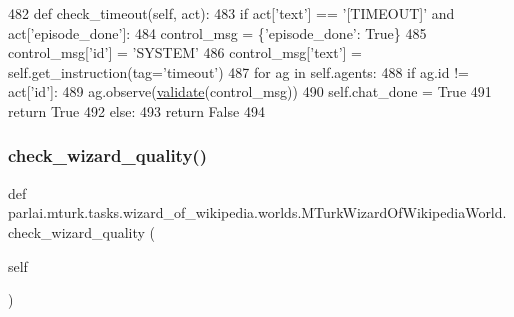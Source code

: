 \begin{DoxyCode}
482     \textcolor{keyword}{def }check\_timeout(self, act):
483         \textcolor{keywordflow}{if} act[\textcolor{stringliteral}{'text'}] == \textcolor{stringliteral}{'[TIMEOUT]'} \textcolor{keywordflow}{and} act[\textcolor{stringliteral}{'episode\_done'}]:
484             control\_msg = \{\textcolor{stringliteral}{'episode\_done'}: \textcolor{keyword}{True}\}
485             control\_msg[\textcolor{stringliteral}{'id'}] = \textcolor{stringliteral}{'SYSTEM'}
486             control\_msg[\textcolor{stringliteral}{'text'}] = self.get\_instruction(tag=\textcolor{stringliteral}{'timeout'})
487             \textcolor{keywordflow}{for} ag \textcolor{keywordflow}{in} self.agents:
488                 \textcolor{keywordflow}{if} ag.id != act[\textcolor{stringliteral}{'id'}]:
489                     ag.observe(\hyperlink{namespaceparlai_1_1core_1_1worlds_afc3fad603b7bce41dbdc9cdc04a9c794}{validate}(control\_msg))
490             self.chat\_done = \textcolor{keyword}{True}
491             \textcolor{keywordflow}{return} \textcolor{keyword}{True}
492         \textcolor{keywordflow}{else}:
493             \textcolor{keywordflow}{return} \textcolor{keyword}{False}
494 
\end{DoxyCode}
\mbox{\label{classparlai_1_1mturk_1_1tasks_1_1wizard__of__wikipedia_1_1worlds_1_1MTurkWizardOfWikipediaWorld_a7667ae6daa0c1befc1c4f815f0daccfd}} 
\subsubsection{\texorpdfstring{check\+\_\+wizard\+\_\+quality()}{check\_wizard\_quality()}}
{\footnotesize\ttfamily def parlai.\+mturk.\+tasks.\+wizard\+\_\+of\+\_\+wikipedia.\+worlds.\+M\+Turk\+Wizard\+Of\+Wikipedia\+World.\+check\+\_\+wizard\+\_\+quality (\begin{DoxyParamCaption}\item[{}]{self }\end{DoxyParamCaption})}

